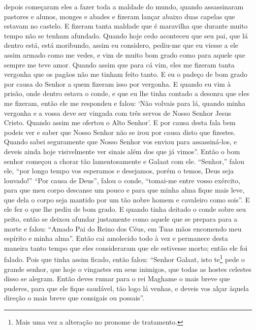 depois começaram eles a fazer toda a maldade do mundo, quando assassinaram
pastores e alunos, monges e abades e fizeram lançar abaixo duas capelas que
estavam no castelo. E fizeram tanta maldade que é maravilha que durante muito
tempo não se tenham afundado. Quando hoje cedo aconteceu que seu pai, que lá
dentro está, está moribundo, assim eu considero, pediu-me que eu viesse a ele
assim armado como me vedes, e vim de muito bom grado como para aquele que
sempre me teve amor. Quando assim que para cá vim, eles me fizeram tanta
vergonha que os pagãos não me tinham feito tanto. E eu o padeço de bom grado
por causa do Senhor a quem fizeram isso por vergonha. E quando eu vim à prisão,
onde dentro estava o conde, e que eu lhe tinha contado a desonra que eles me
fizeram, então ele me respondeu e falou: ‘Não volvais para lá, quando minha
vergonha e a vossa deve ser vingada com três servos de Nosso Senhor Jesus
Cristo. Quando assim me ofertou o Alto Senhor’. E por causa desta fala bem
podeis ver e saber que Nosso Senhor não se irou por causa disto que fizestes.
Quando sabei seguramente que Nosso Senhor vos enviou para assassiná-los, e
deveis ainda hoje visivelmente ver sinais além dos que já vimos”. Então o bom 
senhor começou a chorar tão lamentosamente e Galaat com ele.
“Senhor,” falou ele, “por longo tempo vos esperamos e desejamos, porém o temos,
Deus seja louvado!” “Por causa de Deus”, falou o conde, “tomai-me entre vosso
exército, para que meu corpo descanse um pouco e para que minha alma fique mais
leve, que dela o corpo seja mantido por um tão nobre homem e cavaleiro como
sois”. E ele fez o que lhe pediu de bom grado. E quando tinha deitado o conde
sobre seu peito, então se deixou afundar justamente como aquele que se prepara
para a morte e falou: “Amado Pai do Reino dos Céus, em Tuas mãos encomendo meu
espírito e minha alma”. Então cai amolecido todo à vez e permanece desta
maneira tanto tempo que eles consideraram que ele estivesse morto; então ele
foi falado. Pois que tinha assim ficado, então falou: “Senhor Galaat, isto
te\footnote{ Mais uma vez a alteração no pronome de tratamento.} 
pede o grande senhor, que hoje o vingastes em seus inimigos, que todas as
hostes celestes disso se alegram. Então deves rumar para o rei Maghame o mais
breve que puderes, para que ele fique saudável, tão logo lá venhas, e deveis
vos alçar àquela direção o mais breve que consigais ou possais”. 

